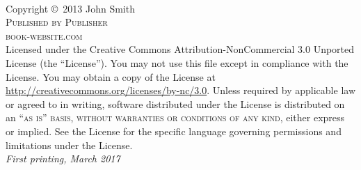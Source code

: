 \documentclass[11pt,fleqn]{book} %
\begin{document}

\begingroup
\thispagestyle{empty}
\vfill
\endgroup


\newpage
~\vfill
\thispagestyle{empty}

\noindent Copyright \copyright\ 2013 John Smith\\ %

\noindent \textsc{Published by Publisher}\\ %

\noindent \textsc{book-website.com}\\ %

\noindent Licensed under the Creative Commons Attribution-NonCommercial 3.0 Unported License (the ``License''). You may not use this file except in compliance with the License. You may obtain a copy of the License at \url{http://creativecommons.org/licenses/by-nc/3.0}. Unless required by applicable law or agreed to in writing, software distributed under the License is distributed on an \textsc{``as is'' basis, without warranties or conditions of any kind}, either express or implied. See the License for the specific language governing permissions and limitations under the License.\\ %

\noindent \textit{First printing, March 2017} %

\end{document}
